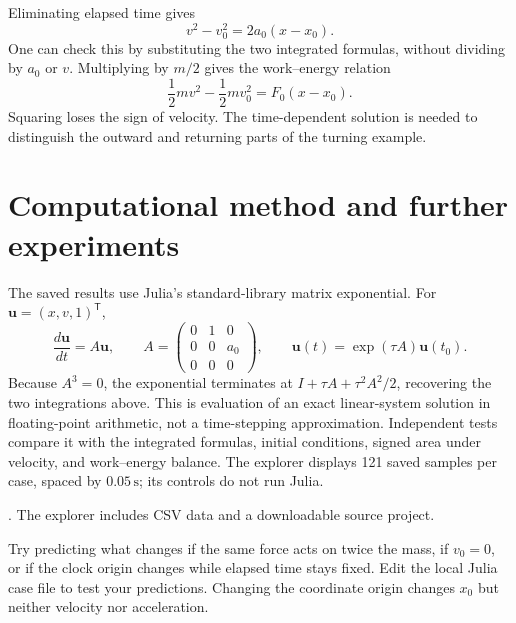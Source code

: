 Eliminating elapsed time gives
\begin{equation}
 v^2-v_0^2=2a_0(x-x_0).
\end{equation}
One can check this by substituting the two integrated formulas, without
dividing by $a_0$ or $v$. Multiplying by $m/2$ gives the work--energy relation
\begin{equation}
 \frac{1}{2}mv^2-\frac{1}{2}mv_0^2=F_0(x-x_0).
\end{equation}
Squaring loses the sign of velocity. The time-dependent solution is needed to
distinguish the outward and returning parts of the turning example.

\section{Computational method and further experiments}
The saved results use Julia's standard-library matrix exponential. For
$\mathbf{u}=(x,v,1)^{\mathsf T}$,
\begin{equation}
 \frac{d\mathbf{u}}{dt}=A\mathbf{u},\qquad
 A=\begin{pmatrix}0&1&0\\0&0&a_0\\0&0&0\end{pmatrix},\qquad
 \mathbf{u}(t)=\exp(\tau A)\mathbf{u}(t_0).
\end{equation}
Because $A^3=0$, the exponential terminates at
$I+\tau A+\tau^2 A^2/2$, recovering the two integrations above.
This is evaluation of an exact linear-system solution in floating-point
arithmetic, not a time-stepping approximation. Independent tests compare it
with the integrated formulas, initial conditions, signed area under velocity,
and work--energy balance. The explorer displays 121 saved samples per case,
spaced by $0.05\,\mathrm{s}$; its controls do not run Julia.

.
The explorer includes CSV data and a downloadable source project.

Try predicting what changes if the same force acts on twice the mass, if
$v_0=0$, or if the clock origin changes while elapsed time stays fixed.
Edit the local Julia case file to test your predictions. Changing the coordinate
origin changes $x_0$ but neither velocity nor acceleration.
